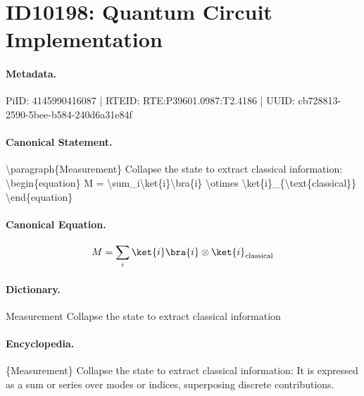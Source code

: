 \section*{ID10198: Quantum Circuit Implementation}
\paragraph{Metadata.}
PiID: 4145990416087 | RTEID: RTE:P39601.0987:T2.4186 | UUID: cb728813-2590-5bee-b584-240d6a31e84f

\paragraph{Canonical Statement.}
\textbackslash{}paragraph\{Measurement\} Collapse the state to extract classical information: \textbackslash{}begin\{equation\} M = \textbackslash{}sum\_i\textbackslash{}ket\{i\}\textbackslash{}bra\{i\} \textbackslash{}otimes \textbackslash{}ket\{i\}\_\{\textbackslash{}text\{classical\}\} \textbackslash{}end\{equation\}

\paragraph{Canonical Equation.}
\[
M = \sum_i\ket{i}\bra{i} \otimes \ket{i}_{\text{classical}}
\]

\paragraph{Dictionary.}
Measurement Collapse the state to extract classical information

\paragraph{Encyclopedia.}
\{Measurement\} Collapse the state to extract classical information: It is expressed as a sum or series over modes or indices, superposing discrete contributions.
